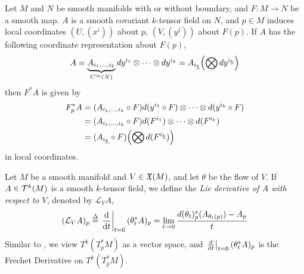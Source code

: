 \documentclass[../main-manifolds.tex]{subfiles}
\begin{document}
\begin{wts}\label{tensor-field-pullback-coordinates}
    Let $M$ and $N$ be smooth manifolds with or without boundary, and $F:M\to N$ be a smooth map. $A$ is a smooth covariant $k$-tensor field on $N$, and $p\in M$ induces local coordinates $(U,(x^i))$ about $p$, $(V,(y^j))$ about $F(p)$. If $A$ has the following coordinate representation about $F(p)$,
    \begin{equation}\label{tensor-field-pullback-coordinates-eq0}
        A = \underbrace{A_{i_1,\ldots,i_k}}_{C^\infty(N)}dy^{i_1}\otimes\cdots\otimes dy^{i_k} = A_{\Ul{i}[k]}\qty(\bigotimes dy^{\Ul{i}[k]})
    \end{equation}
    then $F^*A$ is given by
    \begin{align}\label{tensor-field-pullback-coordinates-eq1}
        F^*_pA &= (A_{i_1,\ldots,i_k}\circ F)d(y^{i_1}\circ F)\otimes \cdots\otimes d(y^{i_k}\circ F)\\
        &= (A_{i_1,\ldots,i_k}\circ F)d(F^{i_1})\otimes \cdots\otimes d(F^{i_k})\\
        &= (A_{\Ul{i}[k]}\circ F)\qty(\bigotimes d(F^{\Ul{i}[k]}))
    \end{align}
    in local coordinates.
\end{wts}

\begin{definition}
    Let $M$ be a smooth manifold and $V\in\mathfrak{X}(M)$, and let $\theta$ be the flow of $V$. If $A\in \mathcal{T}^k(M)$ is a smooth $k$-tensor field, we define the \emph{Lie derivative of $A$ with respect to $V$}, denoted by $\mathcal{L}_V A$, 
    \begin{equation}\label{lie-derivative-eq1-tensor}
        (\mathcal{L}_VA)_p \defined\eval{\dv{t}}_{t=0}(\theta^*_tA)_p = \lim_{t\to 0}\dfrac{d(\theta_t)^*_p(A_{\theta_t(p)}) - A_p}{t}
    \end{equation}
    Similar to , we view $T^k(T^*_pM)$ as a vector space, and $\eval{\dv{t}}_{t=0}(\theta_t^*A)_p$ is the Frechet Derivative on $T^k(T^*_pM)$.
\end{definition}
\end{document}
